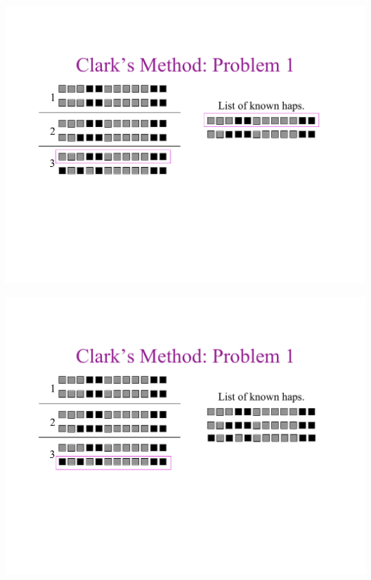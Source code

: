 \newslide{}
\mbox{}
\vspace*{\VertUp}
\enlargethispage*{1000pt}
\begin{center}
\includegraphics*[width=\textwidth]{PPT_pages/pg_0025.pdf}
\end{center}


\newslide{}
\mbox{}
\vspace*{\VertUp}
\enlargethispage*{1000pt}
\begin{center}
\includegraphics*[width=\textwidth]{PPT_pages/pg_0026.pdf}
\end{center}


